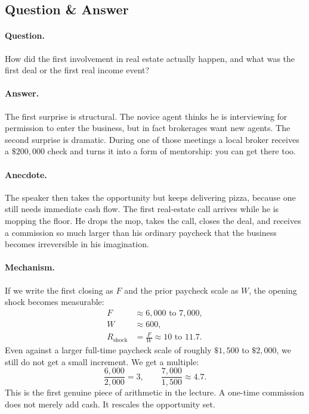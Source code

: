 \subsection{Question \& Answer}

\paragraph{Question.}
How did the first involvement in real estate actually happen, and what was the first deal or the first real income event?

\paragraph{Answer.}
The first surprise is structural. The novice agent thinks he is interviewing for permission to enter the business, but in fact brokerages want new agents. The second surprise is dramatic. During one of those meetings a local broker receives a \(\$200{,}000\) check and turns it into a form of mentorship: you can get there too.

\paragraph{Anecdote.}
The speaker then takes the opportunity but keeps delivering pizza, because one still needs immediate cash flow. The first real-estate call arrives while he is mopping the floor. He drops the mop, takes the call, closes the deal, and receives a commission so much larger than his ordinary paycheck that the business becomes irreversible in his imagination.

\paragraph{Mechanism.}
If we write the first closing as \(F\) and the prior paycheck scale as \(W\), the opening shock becomes measurable:
\begin{align}
F &\approx 6{,}000 \text{ to } 7{,}000,\\
W &\approx 600,\\
R_{\mathrm{shock}} &= \frac{F}{W} \approx 10 \text{ to } 11.7.
\end{align}
Even against a larger full-time paycheck scale of roughly \(\$1{,}500\) to \(\$2{,}000\), we still do not get a small increment. We get a multiple:
\begin{equation}
\frac{6{,}000}{2{,}000}=3,
\qquad
\frac{7{,}000}{1{,}500}\approx 4.7.
\end{equation}
This is the first genuine piece of arithmetic in the lecture. A one-time commission does not merely add cash. It rescales the opportunity set.

